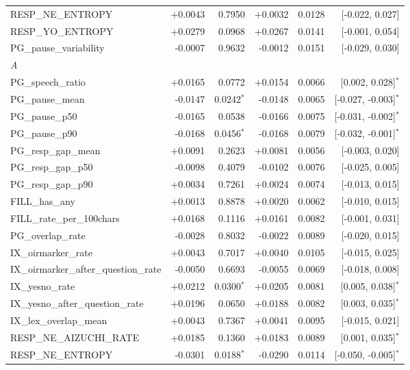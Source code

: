 \begin{longtable}{lrrrrr}
\quad RESP\_NE\_ENTROPY & +0.0043 & 0.7950 & +0.0032 & 0.0128 & [-0.022, 0.027] \\
\quad RESP\_YO\_ENTROPY & +0.0279 & 0.0968 & +0.0267 & 0.0141 & [-0.001, 0.054] \\
\quad PG\_pause\_variability & -0.0007 & 0.9632 & -0.0012 & 0.0151 & [-0.029, 0.030] \\
\midrule
\multicolumn{6}{l}{\textit{A}} \\
\quad PG\_speech\_ratio & +0.0165 & 0.0772 & +0.0154 & 0.0066 & [0.002, 0.028]$^{*}$ \\
\quad PG\_pause\_mean & -0.0147 & 0.0242$^{*}$ & -0.0148 & 0.0065 & [-0.027, -0.003]$^{*}$ \\
\quad PG\_pause\_p50 & -0.0165 & 0.0538 & -0.0166 & 0.0075 & [-0.031, -0.002]$^{*}$ \\
\quad PG\_pause\_p90 & -0.0168 & 0.0456$^{*}$ & -0.0168 & 0.0079 & [-0.032, -0.001]$^{*}$ \\
\quad PG\_resp\_gap\_mean & +0.0091 & 0.2623 & +0.0081 & 0.0056 & [-0.003, 0.020] \\
\quad PG\_resp\_gap\_p50 & -0.0098 & 0.4079 & -0.0102 & 0.0076 & [-0.025, 0.005] \\
\quad PG\_resp\_gap\_p90 & +0.0034 & 0.7261 & +0.0024 & 0.0074 & [-0.013, 0.015] \\
\quad FILL\_has\_any & +0.0013 & 0.8878 & +0.0020 & 0.0062 & [-0.010, 0.015] \\
\quad FILL\_rate\_per\_100chars & +0.0168 & 0.1116 & +0.0161 & 0.0082 & [-0.001, 0.031] \\
\quad PG\_overlap\_rate & -0.0028 & 0.8032 & -0.0022 & 0.0089 & [-0.020, 0.015] \\
\quad IX\_oirmarker\_rate & +0.0043 & 0.7017 & +0.0040 & 0.0105 & [-0.015, 0.025] \\
\quad IX\_oirmarker\_after\_question\_rate & -0.0050 & 0.6693 & -0.0055 & 0.0069 & [-0.018, 0.008] \\
\quad IX\_yesno\_rate & +0.0212 & 0.0300$^{*}$ & +0.0205 & 0.0081 & [0.005, 0.038]$^{*}$ \\
\quad IX\_yesno\_after\_question\_rate & +0.0196 & 0.0650 & +0.0188 & 0.0082 & [0.003, 0.035]$^{*}$ \\
\quad IX\_lex\_overlap\_mean & +0.0043 & 0.7367 & +0.0041 & 0.0095 & [-0.015, 0.021] \\
\quad RESP\_NE\_AIZUCHI\_RATE & +0.0185 & 0.1360 & +0.0183 & 0.0089 & [0.001, 0.035]$^{*}$ \\
\quad RESP\_NE\_ENTROPY & -0.0301 & 0.0188$^{*}$ & -0.0290 & 0.0114 & [-0.050, -0.005]$^{*}$ \\

\end{longtable}
